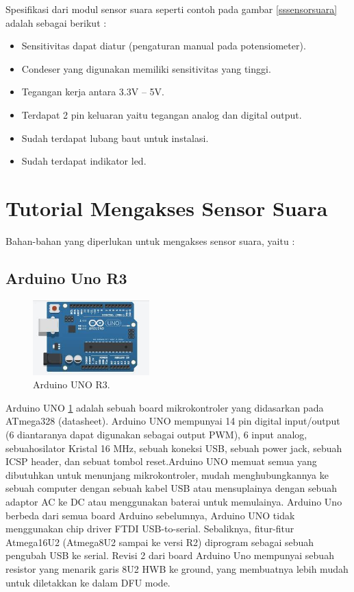 Spesifikasi dari modul sensor suara seperti contoh pada gambar \ref{sssensorsuara} adalah sebagai berikut :

\begin{itemize}
\item Sensitivitas dapat diatur (pengaturan manual pada potensiometer).
\item Condeser yang digunakan memiliki sensitivitas yang tinggi.
\item Tegangan kerja antara 3.3V – 5V.
\item Terdapat 2 pin keluaran yaitu tegangan analog dan digital output.
\item Sudah terdapat lubang baut untuk instalasi.
\item Sudah terdapat indikator led.
\end{itemize}

\section{Tutorial Mengakses Sensor Suara}

\hspace{4mm} Bahan-bahan yang diperlukan untuk mengakses sensor suara, yaitu :

\subsection{Arduino Uno R3}
\begin{figure}[ht]
\centerline{\includegraphics[width=0.4\textwidth]{figures/arduinounor3.jpg}}
\caption{Arduino UNO R3.}
\label{arduinounor3}
\end{figure}
Arduino UNO \ref{arduinounor3} adalah sebuah board mikrokontroler yang didasarkan pada ATmega328 (datasheet). Arduino UNO mempunyai 14 pin digital input/output (6 diantaranya dapat digunakan sebagai output PWM), 6 input analog, sebuahosilator Kristal 16 MHz, sebuah koneksi USB, sebuah power jack, sebuah ICSP header, dan sebuat tombol reset.Arduino UNO memuat semua yang dibutuhkan untuk menunjang mikrokontroler, mudah menghubungkannya ke sebuah computer dengan sebuah kabel USB atau mensuplainya dengan sebuah adaptor AC ke DC atau menggunakan baterai untuk memulainya.
Arduino Uno berbeda dari semua board Arduino sebelumnya, Arduino UNO tidak menggunakan chip driver FTDI USB-to-serial. Sebaliknya, fitur-fitur Atmega16U2 (Atmega8U2 sampai ke versi R2) diprogram sebagai sebuah pengubah USB ke serial. Revisi 2 dari board Arduino Uno mempunyai sebuah resistor yang menarik garis 8U2 HWB ke ground, yang membuatnya lebih mudah untuk diletakkan ke dalam DFU mode.
